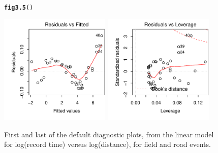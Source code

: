 \documentclass[12pt, a4paper,  BCOR=8.25mm, DIV=15]{scrartcl}\usepackage[]{graphicx}\usepackage[]{color}
\makeatletter
\newcommand{\hlstd}[1]{\textcolor[rgb]{0.345,0.345,0.345}{#1}}%
\newcommand{\hlkwd}[1]{\textcolor[rgb]{0.737,0.353,0.396}{\textbf{#1}}}%
\newenvironment{kframe}{%
 \def\at@end@of@kframe{}%
 \ifinner\ifhmode%
  \def\at@end@of@kframe{\end{minipage}}%
  \begin{minipage}{\columnwidth}%
 \fi\fi%
 \def\FrameCommand##1{\hskip\@totalleftmargin \hskip-\fboxsep
 \colorbox{shadecolor}{##1}\hskip-\fboxsep
     \hskip-\linewidth \hskip-\@totalleftmargin \hskip\columnwidth}%
 \MakeFramed {\advance\hsize-\width
   \@totalleftmargin\z@ \linewidth\hsize
   \@setminipage}}%
 {\par\unskip\endMakeFramed%
 \at@end@of@kframe}
\newenvironment{knitrout}{}{} %
\makeatother
\begin{document}
\begin{figure}
\begin{knitrout}
\color{fgcolor}\begin{kframe}
\begin{alltt}
\hlkwd{fig3.5}\hlstd{()}
\end{alltt}
\end{kframe}

{\centering \includegraphics[width=0.47\textwidth]{figure/exs-fig3_5e-1} 
\includegraphics[width=0.47\textwidth]{figure/exs-fig3_5e-2} 

}



\end{knitrout}
      \caption{First and last of the default diagnostic plots, from the
        linear model for log(record time) versus log(distance), for
        field and road events.}
\label{fig:wr-diag}
\end{figure}
\end{document}
